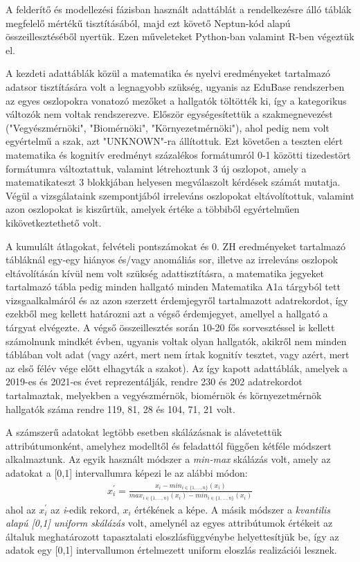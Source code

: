 \documentclass[12pt]{article}
\begin{document}
A felderítő és modellezési fázisban használt adattáblát a rendelkezésre álló táblák megfelelő mértékű tisztításából, majd ezt követő Neptun-kód alapú összeillesztéséből nyertük. Ezen műveleteket Python-ban valamint R-ben végeztük el.

A kezdeti adattáblák közül a matematika és nyelvi eredményeket tartalmazó adatsor tisztítására volt a legnagyobb szükség, ugyanis az EduBase rendszerben az egyes oszlopokra vonatozó mezőket a hallgatók töltötték ki, így a kategorikus változók nem voltak rendszerezve. Először egységesítettük a szakmegnevezést ("Vegyészmérnöki", "Biomérnöki", "Környezetmérnöki"), ahol pedig nem volt egyértelmű a szak, azt "UNKNOWN"-ra állítottuk. Ezt követően a teszten elért matematika és kognitív eredményt százalékos formátumról 0-1 közötti tizedestört formátumra változtattuk, valamint létrehoztunk 3 új oszlopot, amely a matematikateszt 3 blokkjában helyesen megválaszolt kérdések számát mutatja. Végül a vizsgálataink szempontjából irreleváns oszlopokat eltávolítottuk, valamint azon oszlopokat is kiszűrtük, amelyek értéke a többiből egyértelműen kikövetkeztethető volt. 

A kumulált átlagokat, felvételi pontszámokat és 0. ZH eredményeket tartalmazó tábláknál egy-egy hiányos és/vagy anomáliás sor, illetve az irreleváns oszlopok eltávolításán kívül nem volt szükség adattisztításra, a matematika jegyeket tartalmazó tábla pedig minden hallgató minden Matematika A1a tárgyból tett vizsgaalkalmáról és az azon szerzett érdemjegyről tartalmazott adatrekordot, így ezekből meg kellett határozni azt a végső érdemjegyet, amellyel a hallgató a tárgyat elvégezte. A végső összeillesztés során 10-20 fős sorvesztéssel is kellett számolnunk mindkét évben, ugyanis voltak olyan hallgatók, akikről nem minden táblában volt adat (vagy azért, mert nem írtak kognitív tesztet, vagy azért, mert az első félév vége előtt elhagyták a szakot). Az így kapott adattáblák, amelyek a 2019-es és 2021-es évet reprezentálják, rendre 230 és 202 adatrekordot tartalmaztak, melyekben a vegyészmérnök, biomérnök és környezetmérnök hallgatók száma rendre 119, 81, 28 és 104, 71, 21 volt.

A számszerű adatokat legtöbb esetben skálázásnak is alávetettük attribútumonként, amelyhez modelltől és feladattól függően kétféle módszert alkalmaztunk. Az egyik használt módszer a \emph{min-max} skálázás volt, amely az adatokat a [0,1] intervallumra képezi le az alábbi módon:\\
\begin{align}
x_{i}^{'} = \frac{x_{i}-min_{i \in \{1,\dots,n\}}(x_{i})}{max_{i \in \{1,\dots,n\}}(x_{i})-min_{i \in \{1,\dots,n\}}(x_{i})}
\end{align}
ahol az $x_{i}^{'}$ az \emph{i}-edik rekord, $x_i$ értékének a képe. A másik módszer a \emph{kvantilis alapú [0,1] uniform skálázás} volt, amelynél az egyes attribútumok értékeit az általuk meghatározott tapasztalati eloszlásfüggvénybe helyettesítjük be, így az adatok egy [0,1] intervallumon értelmezett uniform eloszlás realizációi lesznek.
\end{document}

